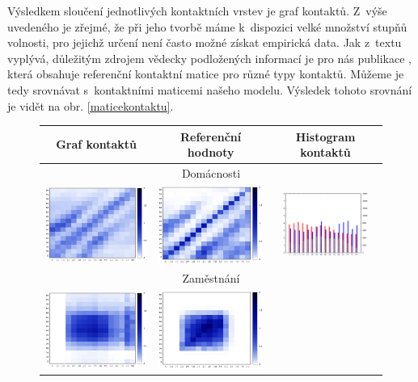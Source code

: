 Výsledkem sloučení jednotlivých kontaktních vrstev je graf kontaktů. Z~výše uvedeného je zřejmé, že při jeho tvorbě máme k~dispozici velké množství stupňů volnosti, pro jejichž určení není často možné získat empirická data. Jak z~textu vyplývá, důležitým zdrojem vědecky podložených informací je pro nás publikace \cite{Prem_etal2017}, která obsahuje referenční kontaktní matice pro různé typy kontaktů. Můžeme je tedy srovnávat s~kontaktními maticemi našeho modelu. Výsledek tohoto srovnání je vidět na obr. \ref{maticekontaktu}.

\begin{figure}
\begin{center}
\begin{tabular}{|ccc|}
      \hline
      Graf kontaktů & Referenční hodnoty & Histogram kontaktů\\
      \hline
      \hline
      \multicolumn{3}{|c|}{Domácnosti} \\
      \includegraphics[width=38mm]{pic/home_mat.eps} &
      \includegraphics[width=38mm]{pic/home_mat_ref.eps} &
      \includegraphics[width=28mm]{pic/home.eps}\\
      \hline
      \multicolumn{3}{|c|}{Zaměstnání} \\
      \includegraphics[width=38mm]{pic/work_mat.eps} &
      \includegraphics[width=38mm]{pic/work_mat_ref.eps} &

\end{tabular}
\end{center}
\end{figure}
